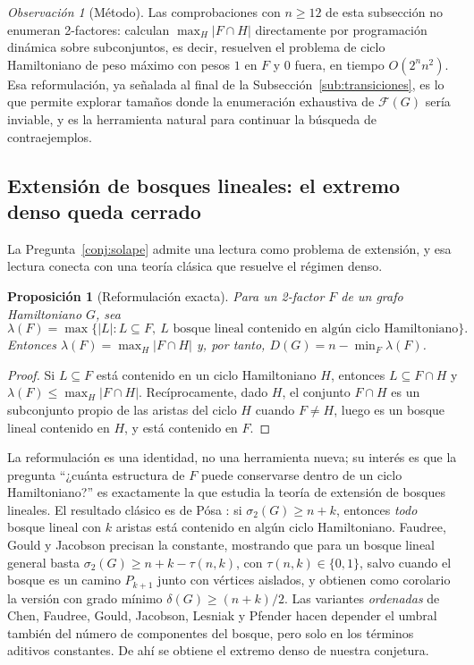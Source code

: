 \documentclass[11pt,a4paper]{article}
\newtheorem{proposicion}[teorema]{Proposición}
\theoremstyle{definition}
\theoremstyle{remark}
\newtheorem{observacion}[teorema]{Observación}
\begin{document}
\begin{observacion}[Método]\label{obs:dp}
Las comprobaciones con $n\ge12$ de esta subsección no enumeran 2-factores: calculan $\max_H|F\cap H|$ directamente por programación dinámica sobre subconjuntos, es decir, resuelven el problema de ciclo Hamiltoniano de peso máximo con pesos $1$ en $F$ y $0$ fuera, en tiempo $O(2^nn^2)$. Esa reformulación, ya señalada al final de la Subsección~\ref{sub:transiciones}, es lo que permite explorar tamaños donde la enumeración exhaustiva de $\mathcal{F}(G)$ sería inviable, y es la herramienta natural para continuar la búsqueda de contraejemplos.
\end{observacion}


\subsection{Extensión de bosques lineales: el extremo denso queda cerrado}\label{sub:bosques}

La Pregunta~\ref{conj:solape} admite una lectura como problema de extensión, y esa lectura conecta con una teoría clásica que resuelve el régimen denso.

\begin{proposicion}[Reformulación exacta]\label{prop:lambda}
Para un 2-factor $F$ de un grafo Hamiltoniano $G$, sea
\[
\lambda(F)=\max\{|L| : L\subseteq F,\ L\text{ bosque lineal contenido en algún ciclo Hamiltoniano}\}.
\]
Entonces $\lambda(F)=\max_H|F\cap H|$ y, por tanto, $D(G)=n-\min_F\lambda(F)$.
\end{proposicion}

\begin{proof}
Si $L\subseteq F$ está contenido en un ciclo Hamiltoniano $H$, entonces $L\subseteq F\cap H$ y $\lambda(F)\le\max_H|F\cap H|$. Recíprocamente, dado $H$, el conjunto $F\cap H$ es un subconjunto propio de las aristas del ciclo $H$ cuando $F\neq H$, luego es un bosque lineal contenido en $H$, y está contenido en $F$.
\end{proof}

La reformulación es una identidad, no una herramienta nueva; su interés es que la pregunta ``¿cuánta estructura de $F$ puede conservarse dentro de un ciclo Hamiltoniano?'' es exactamente la que estudia la teoría de extensión de bosques lineales. El resultado clásico es de Pósa \cite{posa64}: si $\sigma_2(G)\ge n+k$, entonces \emph{todo} bosque lineal con $k$ aristas está contenido en algún ciclo Hamiltoniano. Faudree, Gould y Jacobson \cite{fgj09} precisan la constante, mostrando que para un bosque lineal general basta $\sigma_2(G)\ge n+k-\tau(n,k)$, con $\tau(n,k)\in\{0,1\}$, salvo cuando el bosque es un camino $P_{k+1}$ junto con vértices aislados, y obtienen como corolario la versión con grado mínimo $\delta(G)\ge(n+k)/2$. Las variantes \emph{ordenadas} de Chen, Faudree, Gould, Jacobson, Lesniak y Pfender \cite{cfgjlp04} hacen depender el umbral también del número de componentes del bosque, pero solo en los términos aditivos constantes. De ahí se obtiene el extremo denso de nuestra conjetura.
\end{document}
